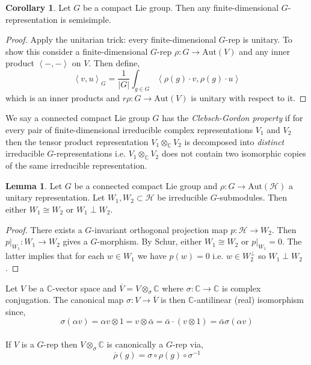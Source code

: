 \documentclass[12pt]{extarticle}
\theoremstyle{definition}
\newtheorem{lemma}[theorem]{Lemma}
\newtheorem{corollary}[theorem]{Corollary}
\newenvironment{definition}[1][Definition:]{\begin{trivlist}
\item[\hskip \labelsep {\bfseries #1}]}{\end{trivlist}}
\newcommand{\Aut}[1]{\mathrm{Aut}\left(#1 \right)}
\newcommand{\C}{\mathbb{C}}
\newcommand{\Hil}{\mathcal{H}}
\newcommand{\inner}[2]{\left< #1, #2 \right>}
\begin{document}
\begin{corollary}
Let $G$ be a compact Lie group. Then any finite-dimensional $G$-representation is semisimple.
\end{corollary}

\begin{proof}
Apply the unitarian trick: every finite-dimensional $G$-rep is unitary. To show this consider a finite-dimensional $G$-rep $\rho : G \to \Aut{V}$ and any inner product $\inner{-}{-}$ on $V$. Then define,
\[ \inner{v}{u}_G = \frac{1}{|G|} \int_{g \in G} \inner{\rho(g) \cdot v}{ \rho(g) \cdot u} \]
which is an inner products and $r\rho : G \to \Aut{V}$ is unitary with respect to it.
\end{proof}

\begin{definition}
We say a connected compact Lie group $G$ has the \textit{Clebsch-Gordon property} if for every pair of finite-dimensional irreducible complex representations $V_1$ and $V_2$ then the tensor product representation $V_1 \otimes_\C V_2$ is decomposed into \textit{distinct} irreducible $G$-representations i.e. $V_1 \otimes_\C V_2$ does not contain two isomorphic copies of the same irreducible representation.
\end{definition}

\begin{lemma}
Let $G$ be a connected compact Lie group and $\rho : G \to \Aut{\Hil}$ a unitary representation. Let $W_1, W_2 \subset \Hil$ be irreducible $G$-submodules. Then either $W_1 \cong W_2$ or $W_1 \perp W_2$. 
\end{lemma}

\begin{proof}
There exists a $G$-invariant orthogonal projection map $p : \Hil \to W_2$. Then $p |_{W_1} : W_1 \to W_2$ gives a $G$-morphism. By Schur, either $W_1 \cong W_2$ or $p|_{W_1} = 0$. The latter implies that for each $w \in W_1$ we have $p(w) = 0$ i.e. $w \in W_2^\perp$ so $W_1 \perp W_2$. 
\end{proof}

\begin{definition}
Let $V$ be a $\C$-vector space and $\overline{V} = V \otimes_\sigma \C$ where $\sigma : \C \to \C$ is complex conjugation. The canonical map $\sigma : V \to \overline{V}$ is then $\C$-antilinear (real) isomorphism since, 
\[ \sigma(\alpha v) = \alpha v \otimes 1 =  v \otimes \bar{\alpha} = \bar{\alpha} \cdot (v \otimes 1) = \bar{\alpha} \sigma(\alpha v) \]
\bigskip\\
If $V$ is a $G$-rep then $V \otimes_\sigma \C$ is canonically a $G$-rep via,
\[ \overline{\rho}(g) = \sigma \circ \rho(g) \circ \sigma^{-1} \] 
\end{definition}
\end{document}
